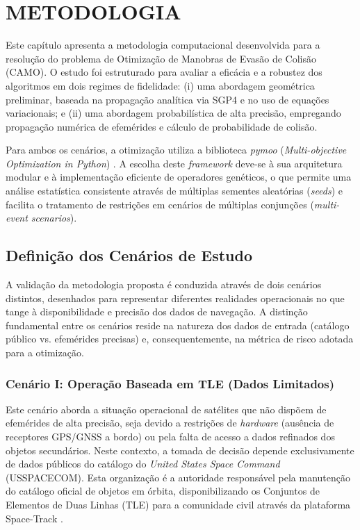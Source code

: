 \chapter{METODOLOGIA}
\label{chap:metodologia}

Este capítulo apresenta a metodologia computacional desenvolvida para a resolução do problema de Otimização de Manobras de Evasão de Colisão (CAMO). O estudo foi estruturado para avaliar a eficácia e a robustez dos algoritmos em dois regimes de fidelidade: (i) uma abordagem geométrica preliminar, baseada na propagação analítica via SGP4 e no uso de equações variacionais; e (ii) uma abordagem probabilística de alta precisão, empregando propagação numérica de efemérides e cálculo de probabilidade de colisão.

Para ambos os cenários, a otimização utiliza a biblioteca \textit{pymoo} (\textit{Multi-objective Optimization in Python}) \cite{pymoo}. A escolha deste \textit{framework} deve-se à sua arquitetura modular e à implementação eficiente de operadores genéticos, o que permite uma análise estatística consistente através de múltiplas sementes aleatórias (\textit{seeds}) e facilita o tratamento de restrições em cenários de múltiplas conjunções (\textit{multi-event scenarios}).

\section{Definição dos Cenários de Estudo}
\label{sec:scenarios_def}

A validação da metodologia proposta é conduzida através de dois cenários distintos, desenhados para representar diferentes realidades operacionais no que tange à disponibilidade e precisão dos dados de navegação. A distinção fundamental entre os cenários reside na natureza dos dados de entrada (catálogo público vs. efemérides precisas) e, consequentemente, na métrica de risco adotada para a otimização.

\subsection{Cenário I: Operação Baseada em TLE (Dados Limitados)}
\label{subsec:scenario_tle}

Este cenário aborda a situação operacional de satélites que não dispõem de efemérides de alta precisão, seja devido a restrições de \textit{hardware} (ausência de receptores GPS/GNSS a bordo) ou pela falta de acesso a dados refinados dos objetos secundários. Neste contexto, a tomada de decisão depende exclusivamente de dados públicos do catálogo do \textit{United States Space Command} (USSPACECOM). Esta organização é a autoridade responsável pela manutenção do catálogo oficial de objetos em órbita, disponibilizando os Conjuntos de Elementos de Duas Linhas (TLE) para a comunidade civil através da plataforma Space-Track \cite{SpaceTrack}.

